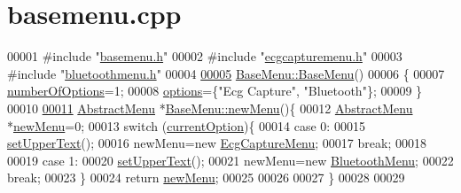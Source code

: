 \hypertarget{basemenu_8cpp_source}{}\section{basemenu.\+cpp}
\label{basemenu_8cpp_source}

\begin{DoxyCode}
00001 \textcolor{preprocessor}{#include "\hyperlink{basemenu_8h}{basemenu.h}"}
00002 \textcolor{preprocessor}{#include "\hyperlink{ecgcapturemenu_8h}{ecgcapturemenu.h}"}
00003 \textcolor{preprocessor}{#include "\hyperlink{bluetoothmenu_8h}{bluetoothmenu.h}"}
00004 
\hypertarget{basemenu_8cpp_source.tex_l00005}{}\hyperlink{classBaseMenu_aac7431fdaecc0ecc3a0695511dc8426f}{00005} \hyperlink{classBaseMenu_aac7431fdaecc0ecc3a0695511dc8426f}{BaseMenu::BaseMenu}()
00006 \{
00007     \hyperlink{classAbstractMenu_a6caff7f6281c6c2912e5f808c2906123}{numberOfOptions}=1;
00008     \hyperlink{classAbstractMenu_a990dc4299fbe86152487fd35d46a403b}{options}=\{\textcolor{stringliteral}{"Ecg Capture"}, \textcolor{stringliteral}{"Bluetooth"}\};
00009 \}
00010 
\hypertarget{basemenu_8cpp_source.tex_l00011}{}\hyperlink{classBaseMenu_a722bb88987e9a64015c59f3419d89704}{00011} \hyperlink{classAbstractMenu}{AbstractMenu} *\hyperlink{classBaseMenu_a722bb88987e9a64015c59f3419d89704}{BaseMenu::newMenu}()\{
00012     \hyperlink{classAbstractMenu}{AbstractMenu} *\hyperlink{classBaseMenu_a722bb88987e9a64015c59f3419d89704}{newMenu}=0;
00013     \textcolor{keywordflow}{switch} (\hyperlink{classAbstractMenu_a589fea1bf68c33e0eff64c8b609cb980}{currentOption})\{
00014     \textcolor{keywordflow}{case} 0:
00015         \hyperlink{classAbstractMenu_a4163c42d2127430e184612cb95211cda}{setUpperText}();
00016         newMenu=\textcolor{keyword}{new} \hyperlink{classEcgCaptureMenu}{EcgCaptureMenu};
00017         \textcolor{keywordflow}{break};
00018 
00019     \textcolor{keywordflow}{case} 1:
00020         \hyperlink{classAbstractMenu_a4163c42d2127430e184612cb95211cda}{setUpperText}();
00021         newMenu=\textcolor{keyword}{new} \hyperlink{classBluetoothMenu}{BluetoothMenu};
00022         \textcolor{keywordflow}{break};
00023     \}
00024     \textcolor{keywordflow}{return} \hyperlink{classBaseMenu_a722bb88987e9a64015c59f3419d89704}{newMenu};
00025 
00026 
00027 \}
00028 
00029 
\end{DoxyCode}
